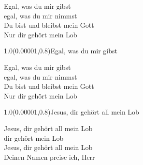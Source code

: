 \documentclass[aspectratio=169]{beamer}
\begin{document}
\begin{frame}
\centering
\color{white}
\huge{Egal, was du mir gibst} \\
\huge{egal, was du mir nimmst} \\
\huge{Du bist und bleibst mein Gott} \\
\huge{Nur dir gehört mein Lob} \\

\begin{textblock}{1.0}(0.00001,0.8)\color{gray}\normalsize{Egal, was du mir gibst}\end{textblock}
\end{frame}

\begin{frame}
\centering
\color{white}
\huge{Egal, was du mir gibst} \\
\huge{egal, was du mir nimmst} \\
\huge{Du bist und bleibst mein Gott} \\
\huge{Nur dir gehört mein Lob} \\

\begin{textblock}{1.0}(0.00001,0.8)\color{gray}\normalsize{Jesus, dir gehört all mein Lob}\end{textblock}
\end{frame}

\begin{frame}
\centering
\color{white}
\huge{Jesus, dir gehört all mein Lob} \\
\huge{dir gehört mein Lob} \\
\huge{Jesus, dir gehört all mein Lob} \\
\huge{Deinen Namen preise ich, Herr} \\
\end{frame}
\end{document}
